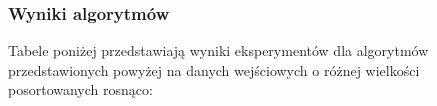 \documentclass{article}
\begin{document}
\subsubsection{Wyniki algorytmów}
Tabele poniżej przedstawiają wyniki eksperymentów dla algorytmów przedstawionych powyżej na danych wejściowych o różnej wielkości posortowanych rosnąco:
\begin{table}[H]
    \centering
    \caption{Liczba operacji i czas wykonania dla naiwnej wersji algorytmu przy różnych rozmiarach tablicy}
    \label{tab:naive_cut_rod_results}
\end{table}
\end{document}
